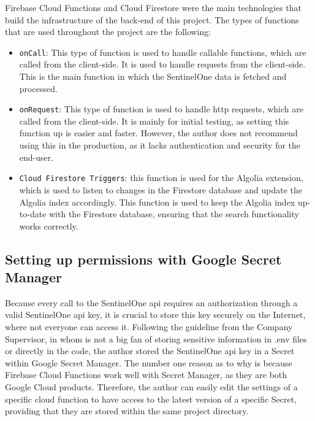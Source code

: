 Firebase Cloud Functions and Cloud Firestore were the main technologies that build the infrastructure of the back-end of this project.
The types of functions that are used throughout the project are the following:
\begin{itemize}
  \item \texttt{onCall}: This type of function is used to handle callable functions, which are called from the client-side. It is used
        to handle requests from the client-side. This is the main function in which the SentinelOne data is fetched and processed.
  \item \texttt{onRequest}: This type of function is used to handle \acrshort{http} requests, which are called from the client-side.
        It is mainly for initial testing, as setting this function up is easier and faster. However, the author does not recommend
        using this in the production, as it lacks authentication and security for the end-user.
  \item \texttt{Cloud Firestore Triggers}: this function is used for the Algolia extension, which is used to listen to changes in the
        Firestore database and update the Algolia index accordingly. This function is used to keep the Algolia index up-to-date with
        the Firestore database, ensuring that the search functionality works correctly.
\end{itemize}

\subsection{Setting up permissions with Google Secret Manager}

Because every call to the SentinelOne \acrshort{api} requires an authorization through a valid SentinelOne \acrshort{api} key, it is
crucial to store this key securely on the Internet, where not everyone can access it. Following the guideline from the Company
Supervisor, in whom is not a big fan of storing sensitive information in .env files or directly in the code, the author stored the
SentinelOne \acrshort{api} key in a Secret within Google Secret Manager. The number one reason as to why is because Firebase Cloud
Functions work well with Secret Manager, as they are both Google Cloud products. Therefore, the author can easily edit the settings of
a specific cloud function to have access to the latest version of a specific Secret, providing that they are stored within the same
project directory.


